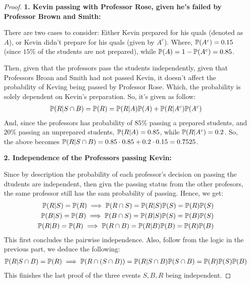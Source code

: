 \documentclass{article}
\begin{document}
\begin{proof}

    \hfil

    \textbf{1. Kevin passing with Professor Rose, given he's failed by Professor Brown and Smith:}

    There are two cases to consider: Either Kevin prepared for his quals (denoted as $A$), or Kevin didn't prepare for his quals (given by $A^c$). Where, $\mathbb{P}(A^c)=0.15$ (since $15\%$ of the students are not prepared), while $\mathbb{P}(A)=1-\mathbb{P}(A^c)=0.85$.

    Then, given that the professors pass the students independently, given that Professors Broan and Smith had not passed Kevin, it doesn't affect the probability of Keving being passed by Professor Rose. Which, the probability is solely dependent on Kevin's preparation. So, it's given as follow:
    \begin{align}
        \mathbb{P}(R|S\cap B)=\mathbb{P}(R)=\mathbb{P}(R|A)\mathbb{P}(A) + \mathbb{P}(R|A^c)\mathbb{P}(A^c)
    \end{align}
    And, since the professors has probability of $85\%$ passing a prepared students, and $20\%$ passing an unprepared students, $\mathbb{P}(R|A)=0.85$, while $\mathbb{P}(R|A^c)=0.2$. So, the above becomes $\mathbb{P}(R|S\cap B)=0.85\cdot 0.85+0.2\cdot 0.15 = 0.7525$.
    
    \hfil

    \textbf{2. Independence of the Professors passing Kevin:}

    Since by description the probability of each professor's decision on passing the dtudents are independent, then givn the passing status from the other profesors, the same professor still has the sam probability of passing. Hence, we get:
    \begin{align}
        \mathbb{P}(R|S) = \mathbb{P}(R)\implies \mathbb{P}(R\cap S)=\mathbb{P}(R|S)\mathbb{P}(S)=\mathbb{P}(R)\mathbb{P}(S)\\
        \mathbb{P}(B|S) = \mathbb{P}(B)\implies \mathbb{P}(B\cap S)=\mathbb{P}(B|S)\mathbb{P}(S)=\mathbb{P}(B)\mathbb{P}(S)\\
        \mathbb{P}(R|B) = \mathbb{P}(R)\implies \mathbb{P}(R\cap B)=\mathbb{P}(R|B)\mathbb{P}(B)=\mathbb{P}(R)\mathbb{P}(B)
    \end{align}
    This first concludes the pairwise independence. Also, follow from the logic in the previous part, we deduce the following:
    \begin{align}
        \mathbb{P}(R|S\cap B)=\mathbb{P}(R)\implies \mathbb{P}(R\cap (S\cap B))=\mathbb{P}(R|S\cap B)\mathbb{P}(S\cap B)= \mathbb{P}(R)\mathbb{P}(S)\mathbb{P}(B)
    \end{align}
    This finishes the last proof of the three events $S,B,R$ being independent.


\end{proof}
\end{document}

